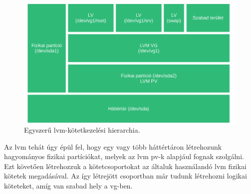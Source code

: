 \begin{figure}[!ht]
	\centering
	\includegraphics[width=14cm]{figures/lvm.pdf}
	\caption{Egyszerű \acrshort{lvm}-kötetkezelési hierarchia.}
	\label{fig:lvm}
\end{figure}

Az \gls{lvm} tehát úgy épül fel, hogy egy vagy több háttértáron létrehozunk hagyományos fizikai partíciókat, melyek az \gls{lvm} \acrshort{pv}-k alapjául fognak szolgálni. Ezt követően létrehozzuk a kötetcsoportokat az általuk használandó \acrshort{lvm} fizikai kötetek megadásával. Az így létrejött csoportban már tudunk létrehozni logikai köteteket, amíg van szabad hely a \acrshort{vg}-ben.

